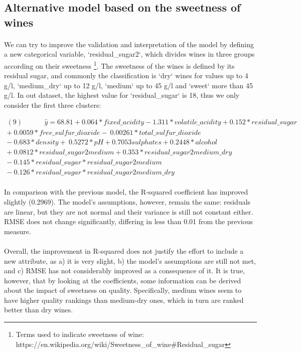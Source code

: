 \documentclass[10pt]{article}
\begin{document}
\subsection{Alternative model based on the sweetness of wines}

\paragraph*{}
We can try to improve the validation and interpretation of the model by defining a new categorical variable, `residual\_sugar2`, which divides wines in three groups according on their sweetness \footnote{Terms used to indicate sweetness of wine: https://en.wikipedia.org/wiki/Sweetness\_of\_wine\#Residual\_sugar}. The sweetness of the wines is defined by its residual sugar, and commonly the classification is `dry` wines for values up to 4 g/l, `medium\_dry` up to 12 g/l,  `medium` up to 45 g/l and `sweet` more than 45 g/l. In out dataset, the highest value for `residual\_sugar` is 18, thus we only consider the first three clusters:

\begin{equation*}
\begin{aligned}	
(9) \ \ \ \  \ \ \ \ \ \ \ \ \ \  \hat{y} = 68.81 + 0.064*fixed\_acidity  -1.311*volatile\_acidity 
+0.152*residual\_sugar \\
+ \  0.0059*free\_sulfur\_dioxide  - \ 0.00261*total\_sulfur\_dioxide   
\\ - \ 0.683*density  + \ 0.5272*pH   + 0.7053sulphates + 0.2448*alcohol \\
+ \ 0.0812 * residual\_sugar2medium + 0.353 * residual\_sugar2medium\_dry \\
- \ 0.145 * residual\_sugar*residual\_sugar2medium \\
- \ 0.126 * residual\_sugar*residual\_sugar2medium\_dry
\end{aligned}
\end{equation*}


\paragraph*{}
In comparison with the previous model, the R-squared coefficient has improved slightly (0.2969). The model's assumptions, however, remain the same: residuals are linear, but they are not normal and their variance is still not constant either. RMSE does not change significantly, differing in less than 0.01 from the previous measure. 

\paragraph*{}
Overall, the improvement in R-squared does not justify the effort to include a new attribute, as a) it is very slight, b) the model's assumptions are still not met, and c) RMSE has not considerably improved as a consequence of it. It is true, however, that by looking at the coefficients, some information can be derived about the impact of sweetness on quality. Specifically, medium wines seem to have higher quality rankings than medium-dry ones, which in turn are ranked better than dry wines. 
\end{document}
